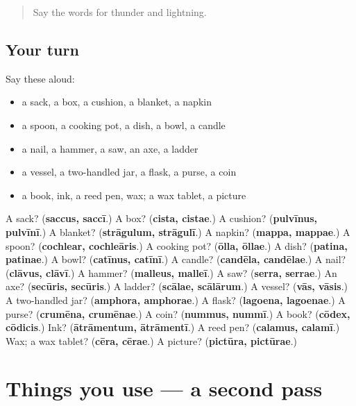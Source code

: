 \label{lesson:LA-R130-first-pass-places-and-things-in-the-house}



\begin{quote}
Say the words for thunder and lightning.
\end{quote}

\subsection*{Your turn}
Say these aloud:

\begin{itemize}
\raggedright
  \item a sack, a box, a cushion, a blanket, a napkin
  \item a spoon, a cooking pot, a dish, a bowl, a candle
  \item a nail, a hammer, a saw, an axe, a ladder
  \item a vessel, a two-handled jar, a flask, a purse, a coin
  \item a book, ink, a reed pen, wax; a wax tablet, a picture
\end{itemize}

\begin{tcolorbox}[breakable,colback=teal!4,colframe=teal!35!black,title={Before you move on}]
A sack? (\textbf{saccus, saccī}.) A box? (\textbf{cista, cistae}.) A cushion? (\textbf{pulvīnus, pulvīnī}.) A blanket? (\textbf{strāgulum, strāgulī}.) A napkin? (\textbf{mappa, mappae}.) A spoon? (\textbf{cochlear, cochleāris}.) A cooking pot? (\textbf{ōlla, ōllae}.) A dish? (\textbf{patina, patinae}.) A bowl? (\textbf{catīnus, catīnī}.) A candle? (\textbf{candēla, candēlae}.) A nail? (\textbf{clāvus, clāvī}.) A hammer? (\textbf{malleus, malleī}.) A saw? (\textbf{serra, serrae}.) An axe? (\textbf{secūris, secūris}.) A ladder? (\textbf{scālae, scālārum}.) A vessel? (\textbf{vās, vāsis}.) A two-handled jar? (\textbf{amphora, amphorae}.) A flask? (\textbf{lagoena, lagoenae}.) A purse? (\textbf{crumēna, crumēnae}.) A coin? (\textbf{nummus, nummī}.) A book? (\textbf{cōdex, cōdicis}.) Ink? (\textbf{ātrāmentum, ātrāmentī}.) A reed pen? (\textbf{calamus, calamī}.) Wax; a wax tablet? (\textbf{cēra, cērae}.) A picture? (\textbf{pictūra, pictūrae}.)
\end{tcolorbox}
\section[(dialogue)]{Things you use — a second pass}


